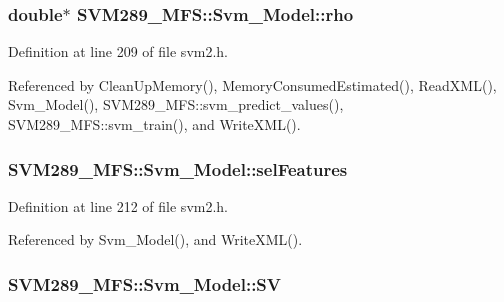 \subsubsection[{\texorpdfstring{rho}{rho}}]{\setlength{\rightskip}{0pt plus 5cm}double$\ast$ S\+V\+M289\+\_\+\+M\+F\+S\+::\+Svm\+\_\+\+Model\+::rho}\hypertarget{struct_s_v_m289___m_f_s_1_1_svm___model_ac6ee5562a25222e436bb29497cc98525}{}\label{struct_s_v_m289___m_f_s_1_1_svm___model_ac6ee5562a25222e436bb29497cc98525}


Definition at line 209 of file svm2.\+h.



Referenced by Clean\+Up\+Memory(), Memory\+Consumed\+Estimated(), Read\+X\+M\+L(), Svm\+\_\+\+Model(), S\+V\+M289\+\_\+\+M\+F\+S\+::svm\+\_\+predict\+\_\+values(), S\+V\+M289\+\_\+\+M\+F\+S\+::svm\+\_\+train(), and Write\+X\+M\+L().

\subsubsection[{\texorpdfstring{sel\+Features}{selFeatures}}]{ S\+V\+M289\+\_\+\+M\+F\+S\+::\+Svm\+\_\+\+Model\+::sel\+Features}\hypertarget{struct_s_v_m289___m_f_s_1_1_svm___model_a9a7868a9a65154d09d596dd97fb875a2}{}\label{struct_s_v_m289___m_f_s_1_1_svm___model_a9a7868a9a65154d09d596dd97fb875a2}


Definition at line 212 of file svm2.\+h.



Referenced by Svm\+\_\+\+Model(), and Write\+X\+M\+L().

\subsubsection[{\texorpdfstring{SV}{SV}}]{ S\+V\+M289\+\_\+\+M\+F\+S\+::\+Svm\+\_\+\+Model\+::\+SV}\hypertarget{struct_s_v_m289___m_f_s_1_1_svm___model_ab2ebe759ca5aabb85fc6deea03706f0a}{}\label{struct_s_v_m289___m_f_s_1_1_svm___model_ab2ebe759ca5aabb85fc6deea03706f0a}


